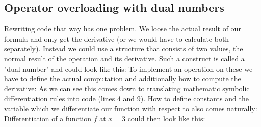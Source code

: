 \subsection{Operator overloading with dual numbers}
Rewriting code that way has one problem. We loose the actual result of our formula and only get the derivative (or we would have to calculate both separately). Instead we could use a structure that consists of two values, the normal result of the operation and its derivative. Such a construct is called a "dual number"  and could look like this:
To implement an operation on these we have to define the actual computation and additionally how to compute the derivative:
As we can see this comes down to translating mathematic symbolic differentiation rules into code (lines 4 and 9). How to define constants and the variable which we differentiate our function with respect to  also comes naturally:
Differentiation of a function $f$ at $x = 3$ could then look like this:


